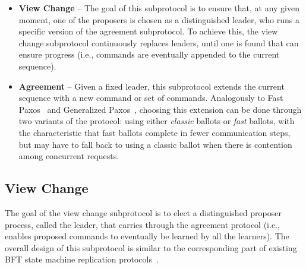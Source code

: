 \begin{itemize}
	
	\item
	{\bf View Change} -- The goal of this subprotocol is to ensure that, at any given moment, one of the proposers is chosen as a distinguished leader, who runs a specific version of the agreement subprotocol. To achieve this, the view change subprotocol continuously replaces leaders, until one is found that can ensure progress (i.e., commands are eventually appended to the current sequence).
	
	\item
	{\bf Agreement} -- Given a fixed leader, this subprotocol extends the current sequence with a new command or set of commands. Analogously to Fast Paxos~\cite{L06} and Generalized Paxos~\cite{Lamport2005}, choosing this extension can be done through two variants of the protocol: using either \textit{classic} ballots or \textit{fast} ballots, with the characteristic that fast ballots complete in fewer communication steps, but may have to fall back to using a classic ballot when there is contention among concurrent requests.
	
\end{itemize}

\subsection{View Change} 

The goal of the view change subprotocol is to elect a distinguished proposer process, called the leader, that carries through the agreement protocol (i.e., enables proposed commands to eventually be learned by all the learners). The overall design of this subprotocol is similar to the corresponding part of existing BFT state machine replication protocols~\cite{CL99}.\par

